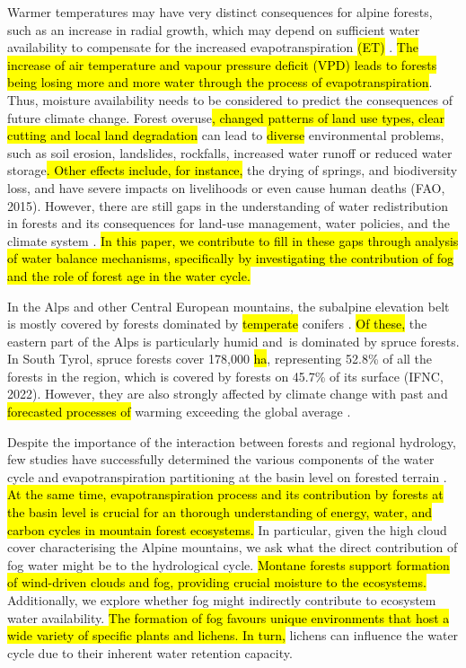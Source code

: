 \documentclass[10pt,letterpaper]{article}
\begin{document}
Warmer temperatures may have very distinct consequences for alpine forests, such as an increase in radial growth, which may depend on sufficient water availability to compensate for the increased evapotranspiration \hl{(ET)} \cite{Vittoz}. \hl{The increase of air temperature and vapour pressure deficit (VPD) leads to forests being losing more and more water through the process of evapotranspiration}. Thus, moisture availability needs to be considered to predict the consequences of future climate change. Forest overuse\hl{, changed patterns of land use types, clear cutting and local land degradation} can lead to \hl{diverse }environmental problems, such as soil erosion, landslides, rockfalls, increased water runoff or reduced water storage\hl{. Other effects include, for instance, }the drying of springs, and biodiversity loss, and have severe impacts on livelihoods or even cause human deaths (FAO, 2015). However, there are still gaps in the understanding of water redistribution in forests and its consequences for land-use management, water policies, and the climate system \cite{Gordon}. \hl{In this paper, we contribute to fill in these gaps through analysis of water balance mechanisms, specifically by investigating the contribution of fog and the role of forest age in the water cycle.}

In the Alps and other Central European mountains, the subalpine elevation belt is mostly covered by forests dominated by \hl{temperate} conifers \cite{Bohn}. \hl{Of these, }the eastern part of the Alps is particularly humid and is dominated by spruce forests. In South Tyrol, spruce forests cover 178,000 \hl{ha}, representing 52.8\% of all the forests in the region, which is covered by forests on 45.7\% of its surface (IFNC, 2022). However, they are also strongly affected by climate change with past and \hl{forecasted processes of} warming exceeding the global average \cite{Beniston,GOBIET20141138,Gordon}. 

Despite the importance of the interaction between forests and regional hydrology, few studies have successfully determined the various components of the water cycle and evapotranspiration partitioning at the basin level on forested terrain \cite{CASTELLI2018327}. \hl{ At the same time, evapotranspiration process and its contribution by forests at the basin level is crucial for an thorough understanding of energy, water, and carbon cycles in mountain forest ecosystems.} In particular, given the high cloud cover characterising the Alpine mountains, we ask what the direct contribution of fog water might be to the hydrological cycle. \hl{Montane forests support formation of wind-driven clouds and fog, providing crucial moisture to the ecosystems. }Additionally, we explore whether fog might indirectly contribute to ecosystem water availability. \hl{The formation of fog favours unique environments that host a wide variety of specific plants and lichens. In turn,} lichens\hl{ }can influence the water cycle due to their inherent water retention capacity.
\end{document}
